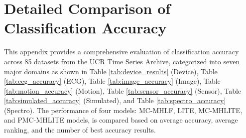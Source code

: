 \documentclass[conference]{IEEEtran}
\begin{document}


\appendices


\section{Detailed Comparison of Classification Accuracy}

This appendix provides a comprehensive evaluation of classification accuracy across 85 datasets from the UCR Time Series Archive, categorized into seven major domains as shown in Table \ref{tab:device_results} (Device), Table \ref{tab:ecg_accuracy} (ECG), Table \ref{tab:image_accuracy} (Image), Table \ref{tab:motion_accuracy} (Motion), Table \ref{tab:sensor_accuracy} (Sensor), Table \ref{tab:simulated_accuracy} (Simulated), and Table \ref{tab:spectro_accuracy} (Spectro). The performance of four models: MC-MHLF, LITE, MC-MHLITE, and PMC-MHLITE models, is compared based on average accuracy, average ranking, and the number of best accuracy results.


\begin{table}[htb]
  \centering
  \caption{Comparison of classification accuracy for each model in the ``Device'' category}
  \label{tab:device_results}
\end{table}
\end{document}
